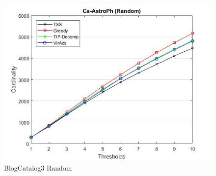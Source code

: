 \begin{figure}
	\centering	
	\includegraphics[scale=0.5]{images/ca-astrophresultrandom.jpg}
	\caption{BlogCatalog3 Random}
\end{figure}

